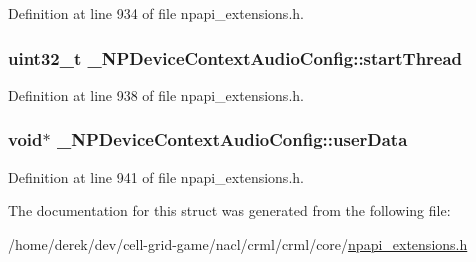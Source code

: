 Definition at line 934 of file npapi\_\-extensions.h.

\hypertarget{struct___n_p_device_context_audio_config_a4456ec356a3d5da2b9d05d8de19868ee}{
\subsubsection[{startThread}]{\setlength{\rightskip}{0pt plus 5cm}uint32\_\-t {\bf \_\-NPDeviceContextAudioConfig::startThread}}}
\label{struct___n_p_device_context_audio_config_a4456ec356a3d5da2b9d05d8de19868ee}


Definition at line 938 of file npapi\_\-extensions.h.

\hypertarget{struct___n_p_device_context_audio_config_a02dc164c09c13d1a97adde1544a0a787}{
\subsubsection[{userData}]{\setlength{\rightskip}{0pt plus 5cm}void$\ast$ {\bf \_\-NPDeviceContextAudioConfig::userData}}}
\label{struct___n_p_device_context_audio_config_a02dc164c09c13d1a97adde1544a0a787}


Definition at line 941 of file npapi\_\-extensions.h.



The documentation for this struct was generated from the following file:\begin{DoxyCompactItemize}
\item 
/home/derek/dev/cell-\/grid-\/game/nacl/crml/crml/core/\hyperlink{npapi__extensions_8h}{npapi\_\-extensions.h}\end{DoxyCompactItemize}
